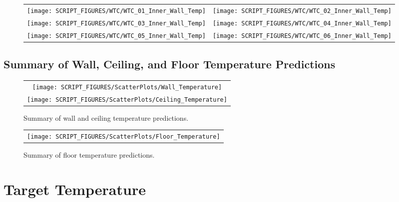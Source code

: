 \begin{figure}[p]
\begin{tabular*}{\textwidth}{l@{\extracolsep{\fill}}r}
\texttt{[image: SCRIPT\_FIGURES/WTC/WTC\_01\_Inner\_Wall\_Temp]} &
\texttt{[image: SCRIPT\_FIGURES/WTC/WTC\_02\_Inner\_Wall\_Temp]} \\
\texttt{[image: SCRIPT\_FIGURES/WTC/WTC\_03\_Inner\_Wall\_Temp]} &
\texttt{[image: SCRIPT\_FIGURES/WTC/WTC\_04\_Inner\_Wall\_Temp]} \\
\texttt{[image: SCRIPT\_FIGURES/WTC/WTC\_05\_Inner\_Wall\_Temp]} &
\texttt{[image: SCRIPT\_FIGURES/WTC/WTC\_06\_Inner\_Wall\_Temp]}
\end{tabular*}
\label{NIST_WTC_Inner_Wall}
\end{figure}

\clearpage

\subsection{Summary of Wall, Ceiling, and Floor Temperature Predictions}


\begin{figure}[h!]
\begin{center}
\begin{tabular}{c}
\texttt{[image: SCRIPT\_FIGURES/ScatterPlots/Wall\_Temperature]} \\
\texttt{[image: SCRIPT\_FIGURES/ScatterPlots/Ceiling\_Temperature]}
\end{tabular}
\end{center}
\caption[Summary of wall and ceiling temperature predictions]
{Summary of wall and ceiling temperature predictions.}
\end{figure}

\begin{figure}[h!]
\begin{center}
\begin{tabular}{c}
\texttt{[image: SCRIPT\_FIGURES/ScatterPlots/Floor\_Temperature]}
\end{tabular}
\end{center}
\caption[Summary of floor temperature predictions]
{Summary of floor temperature predictions.}
\end{figure}

\clearpage

\section{Target Temperature}

